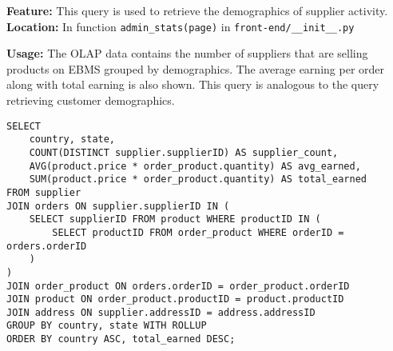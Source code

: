 \textbf{Feature:} This query is used to retrieve the demographics of supplier activity. \\
\textbf{Location:} In function \texttt{admin\_stats(page)} in \texttt{front-end/\_\_init\_\_.py}

\textbf{Usage:}
The OLAP data contains the number of suppliers that are selling products on EBMS grouped by demographics.
The average earning per order along with total earning is also shown.
This query is analogous to the query retrieving customer demographics.

\begin{lstlisting}
SELECT
    country, state,
    COUNT(DISTINCT supplier.supplierID) AS supplier_count,
    AVG(product.price * order_product.quantity) AS avg_earned,
    SUM(product.price * order_product.quantity) AS total_earned
FROM supplier
JOIN orders ON supplier.supplierID IN (
    SELECT supplierID FROM product WHERE productID IN (
        SELECT productID FROM order_product WHERE orderID = orders.orderID
    )
)
JOIN order_product ON orders.orderID = order_product.orderID
JOIN product ON order_product.productID = product.productID
JOIN address ON supplier.addressID = address.addressID
GROUP BY country, state WITH ROLLUP
ORDER BY country ASC, total_earned DESC;
\end{lstlisting}